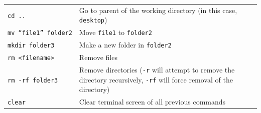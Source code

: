 \documentclass[]{book}
\begin{document}
\begin{longtable}[]{@{}ll@{}}
\begin{minipage}[t]{0.14\columnwidth}
\texttt{cd\ ..}\strut
\end{minipage} & \begin{minipage}[t]{0.18\columnwidth}\raggedright\strut
Go to parent of the working directory (in this case,
\texttt{desktop})\strut
\end{minipage}\tabularnewline
\begin{minipage}[t]{0.14\columnwidth}\raggedright\strut
\texttt{mv\ “file1”\ folder2}\strut
\end{minipage} & \begin{minipage}[t]{0.18\columnwidth}\raggedright\strut
Move \texttt{file1} to \texttt{folder2}\strut
\end{minipage}\tabularnewline
\begin{minipage}[t]{0.14\columnwidth}\raggedright\strut
\texttt{mkdir\ folder3}\strut
\end{minipage} & \begin{minipage}[t]{0.18\columnwidth}\raggedright\strut
Make a new folder in \texttt{folder2}\strut
\end{minipage}\tabularnewline
\begin{minipage}[t]{0.14\columnwidth}\raggedright\strut
\texttt{rm\ \textless{}filename\textgreater{}}\strut
\end{minipage} & \begin{minipage}[t]{0.18\columnwidth}\raggedright\strut
Remove files\strut
\end{minipage}\tabularnewline
\begin{minipage}[t]{0.14\columnwidth}\raggedright\strut
\texttt{rm\ -rf\ folder3}\strut
\end{minipage} & \begin{minipage}[t]{0.18\columnwidth}\raggedright\strut
Remove directories (\texttt{-r} will attempt to remove the directory
recursively, \texttt{-rf} will force removal of the directory)\strut
\end{minipage}\tabularnewline
\begin{minipage}[t]{0.14\columnwidth}\raggedright\strut
\texttt{clear}\strut
\end{minipage} & \begin{minipage}[t]{0.18\columnwidth}\raggedright\strut
Clear terminal screen of all previous commands\strut
\end{minipage}\tabularnewline
\bottomrule
\end{longtable}
\end{document}
